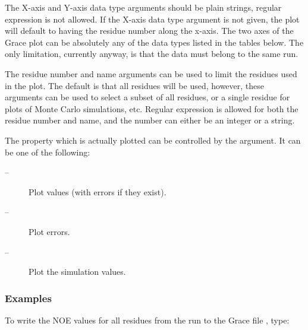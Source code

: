 The X-axis and Y-axis data type arguments should be plain strings, regular expression is not allowed.  If the X-axis data type argument is not given, the plot will default to having the residue number along the x-axis.  The two axes of the Grace plot can be absolutely any of the data types listed in the tables below.  The only limitation, currently anyway, is that the data must belong to the same run.


The residue number and name arguments can be used to limit the residues used in the plot. The default is that all residues will be used, however, these arguments can be used to select a subset of all residues, or a single residue for plots of Monte Carlo simulations, etc.  Regular expression is allowed for both the residue number and name, and the number can either be an integer or a string.


The property which is actually plotted can be controlled by the  argument.  It can be one of the following:


\begin{description}
\item[ --]  Plot values (with errors if they exist). 
\item[ --]  Plot errors. 
\item[ --]   Plot the simulation values. 
\end{description}



\subsubsection{Examples}

To write the NOE values for all residues from the run  to the Grace file , type:






